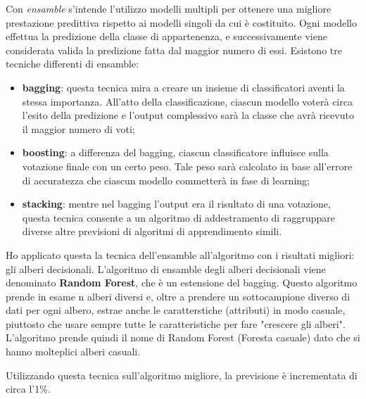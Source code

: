 \documentclass[12pt,a4paper]{article}
\begin{document}
Con \textit{ensamble} s'intende l'utilizzo modelli multipli per ottenere una migliore prestazione predittiva rispetto ai modelli singoli da cui è costituito. Ogni modello effettua la predizione della classe di appartenenza, e successivamente viene considerata valida la predizione fatta dal maggior numero di essi.
Esistono tre tecniche differenti di ensamble:
\begin{itemize}
    \item \textbf{bagging}: questa tecnica mira a creare un insieme di classificatori aventi la stessa importanza. All'atto della classificazione, ciascun modello voterà circa l'esito della predizione e l'output complessivo sarà la classe che avrà ricevuto il maggior numero di voti;
    \item \textbf{boosting}: a differenza del bagging, ciascun classificatore influisce sulla votazione finale con un certo peso. Tale peso sarà calcolato in base all'errore di accuratezza che ciascun modello commetterà in fase di learning;
    \item \textbf{stacking}: mentre nel bagging l'output era il risultato di una votazione, questa tecnica consente a un algoritmo di addestramento di raggruppare diverse altre previsioni di algoritmi di apprendimento simili.
\end{itemize}

Ho applicato questa la tecnica dell'ensamble all'algoritmo con i risultati migliori: gli alberi decisionali.
L'algoritmo di ensamble degli alberi decisionali viene denominato \textbf{Random Forest}, che è un estensione del bagging. Questo algoritmo prende in esame n alberi diversi e, oltre a prendere un sottocampione diverso di dati per ogni albero, estrae anche le caratterstiche (attributi) in modo casuale, piuttosto che usare sempre tutte le caratteristiche per fare "crescere gli alberi".\hfill\break
L'algoritmo prende quindi il nome di Random Forest (Foresta casuale) dato che si hanno molteplici alberi casuali.

Utilizzando questa tecnica sull'algoritmo migliore, la previsione è incrementata di circa l'1\%.
\end{document}
